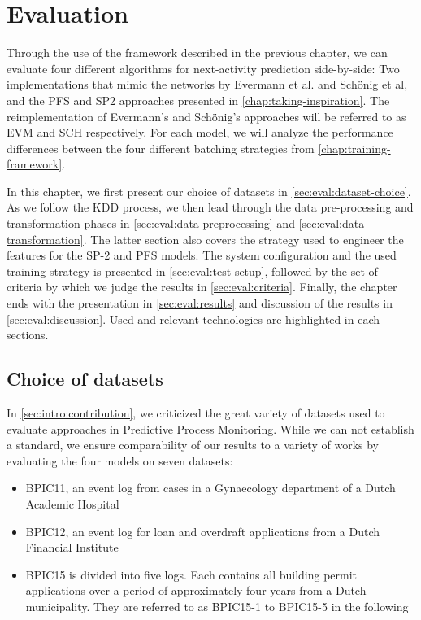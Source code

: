 \chapter{Evaluation}\label{chap:evaluation}
Through the use of the framework described in the previous chapter, we can evaluate four different algorithms for next-activity prediction side-by-side: Two implementations that mimic the networks by Evermann et al. and Schönig et al, and the PFS and SP2 approaches presented in \autoref{chap:taking-inspiration}. The reimplementation of Evermann's and Schönig's approaches will be referred to as EVM and SCH respectively. For each model, we will analyze the performance differences between the four different batching strategies from \autoref{chap:training-framework}.

In this chapter, we first present our choice of datasets in \autoref{sec:eval:dataset-choice}. As we follow the KDD process, we then lead through the data pre-processing and transformation phases in \autoref{sec:eval:data-preprocessing} and \autoref{sec:eval:data-transformation}. The latter section also covers the strategy used to engineer the features for the SP-2 and PFS models.
The system configuration and the used training strategy is presented in \autoref{sec:eval:test-setup}, followed by the set of criteria by which we judge the results in \autoref{sec:eval:criteria}. Finally, the chapter ends with the presentation in \autoref{sec:eval:results} and discussion of the results in \autoref{sec:eval:discussion}. Used and relevant technologies are highlighted in each sections.

\section{Choice of datasets}
\label{sec:eval:dataset-choice}
In \autoref{sec:intro:contribution}, we criticized the great variety of datasets used to evaluate approaches in Predictive Process Monitoring. While we can not establish a standard, we ensure comparability of our results to a variety of works by evaluating the four models on seven datasets:

\begin{itemize}
    \item BPIC11, an event log from cases in a Gynaecology department of a Dutch Academic Hospital~\cite{BPIC2011}
    \item BPIC12, an event log for loan and overdraft applications from a Dutch Financial Institute~\cite{BPIC2012}
    \item BPIC15 is divided into five logs. Each contains all building permit applications over a period of approximately four years from a Dutch municipality. They are referred to as BPIC15-1 to BPIC15-5 in the following~\cite{BPIC2015}
\end{itemize}

